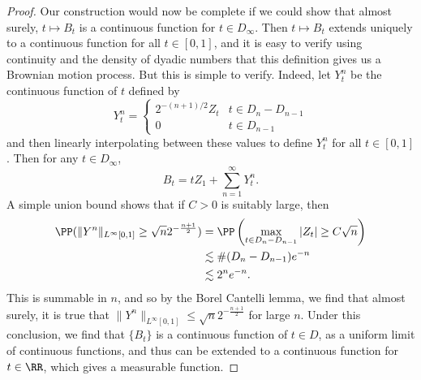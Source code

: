 \begin{proof}
    Our construction would now be complete if we could show that almost surely, $t \mapsto B_t$ is a continuous function for $t \in D_\infty$. Then $t \mapsto B_t$ extends uniquely to a continuous function for all $t \in [0,1]$, and it is easy to verify using continuity and the density of dyadic numbers that this definition gives us a Brownian motion process. But this is simple to verify.
    Indeed, let $Y^n_t$ be the continuous function of $t$ defined by
    \[ Y^n_t = \begin{cases} 2^{-(n+1)/2} Z_t & t \in D_n - D_{n-1} \\ 0 & t \in D_{n-1} \end{cases} \]
    and then linearly interpolating between these values to define $Y^n_t$ for all $t \in [0,1]$. Then for any $t \in D_\infty$,
    \[ B_t = t Z_1 + \sum_{n = 1}^\infty Y^n_t. \]
    A simple union bound shows that if $C > 0$ is suitably large, then
    \begin{align*}
        \PP( \| Y^n \|_{L^\infty[0,1]} \geq \sqrt{n} 2^{- \frac{n+1}{2}} ) &= \PP \left( \max_{t \in D_n - D_{n-1}} |Z_t| \geq C \sqrt{n} \right)\\
        &\lesssim \#(D_n - D_{n-1}) e^{- n}\\
        &\lesssim 2^n e^{- n}.
    \end{align*}
    This is summable in $n$, and so by the Borel Cantelli lemma, we find that almost surely, it is true that $\| Y^n \|_{L^\infty[0,1]} \leq \sqrt{n} 2^{- \frac{n+1}{2}}$ for large $n$. Under this conclusion, we find that $\{ B_t \}$ is a continuous function of $t \in D$, as a uniform limit of continuous functions, and thus can be extended to a continuous function for $t \in \RR$, which gives a measurable function.
\end{proof}

